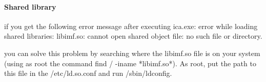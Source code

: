 \paragraph{Shared library} if you get the following error message after executing ica.exe: 
                        error while loading shared libraries: 
                        libimf.so: cannot open shared object file: 
                        no such file or directory.

                        you can solve this problem by searching where the libimf.so file is on your system (using as root the command find / -iname *libimf.so*). As root, put the path to this file in the /etc/ld.so.conf and run /sbin/ldconfig.

